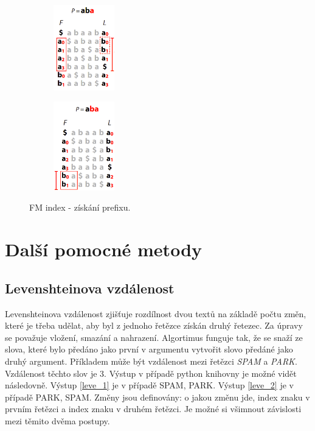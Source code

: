 \documentclass[czech,DP]{thesiskiv}
\numberwithin{equation}{section}
\begin{document}
\begin{figure}[H]
		\centering
		\begin{subfigure}[t]{.4\textwidth}
			\centering
			\includegraphics[width=100px]{./img/FM_index_1.png}
		\end{subfigure}
		\begin{subfigure}[t]{.4\textwidth}
			\centering
			\includegraphics[width=100px]{./img/FM_index_2.png}
		\end{subfigure}	
		\caption{FM index - získání prefixu. \cite{bw_transform}}
		\label{fig:fm_index}
\end{figure}


\section{Další pomocné metody}
\subsection{Levenshteinova vzdálenost}
Levenshteinova vzdálenost zjišťuje rozdílnost dvou textů na základě počtu změn, které je třeba udělat, aby byl z jednoho řetězce získán druhý řetezec. Za úpravy se považuje vložení, smazání a nahrazení. Algortimus funguje tak, že se snaží ze slova, které bylo předáno jako první v argumentu vytvořit slovo předáné jako druhý argument. Příkladem může být vzdálenost mezi řetězci \textit{SPAM} a \textit{PARK}.  Vzdálenost těchto slov je 3. Výstup v případě python knihovny je možné vidět následovně. Výstup \ref{leve_1} je v případě SPAM, PARK. Výstup \ref{leve_2} je v případě PARK, SPAM. Změny jsou definovány: o jakou změnu jde, index znaku v prvním řetězci a index znaku v druhém řetězci. Je možné si všimnout závislosti mezi těmito dvěma postupy. \cite{levenshrein_baku}
\end{document}
